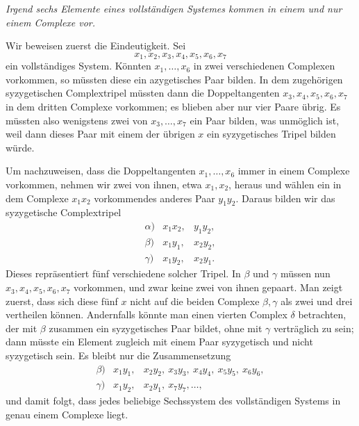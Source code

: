 \documentclass[11pt]{article}
\begin{document}
\emph{Irgend sechs Elemente eines vollständigen Systemes kommen in einem und nur einem Complexe vor.}

Wir beweisen zuerst die Eindeutigkeit. Sei
\begin{equation}
 x_1,x_2,x_3,x_4,x_5,x_6,x_7
 \tag{1}
\end{equation}
ein vollständiges System. Könnten \(x_1,\ldots,x_6\) in zwei verschiedenen Complexen vorkommen, so müssten diese ein azygetisches Paar bilden. In dem zugehörigen syzygetischen Complextripel müssten dann die Doppeltangenten \(x_3,x_4,x_5,x_6,x_7\) in dem dritten Complexe vorkommen; es blieben aber nur vier Paare übrig. Es müssten also wenigstens zwei von \(x_3,\ldots,x_7\) ein Paar bilden, was unmöglich ist, weil dann dieses Paar mit einem der übrigen \(x\) ein syzygetisches Tripel bilden würde.

Um nachzuweisen, dass die Doppeltangenten \(x_1,\ldots,x_6\) immer in einem Complexe vorkommen, nehmen wir zwei von ihnen, etwa \(x_1,x_2\), heraus und wählen ein in dem Complexe \(x_1x_2\) vorkommendes anderes Paar \(y_1y_2\). Daraus bilden wir das syzygetische Complextripel
\begin{equation}
\begin{array}{lll}
\alpha)&x_1x_2,&y_1y_2,\\
\beta)&x_1y_1,&x_2y_2,\\
\gamma)&x_1y_2,&x_2y_1.
\end{array}
\tag{2}
\end{equation}
Dieses repräsentiert fünf verschiedene solcher Tripel. In \(\beta\) und \(\gamma\) müssen nun \(x_3,x_4,x_5,x_6,x_7\) vorkommen, und zwar keine zwei von ihnen gepaart. Man zeigt zuerst, dass sich diese fünf \(x\) nicht auf die beiden Complexe \(\beta,\gamma\) als zwei und drei vertheilen können. Andernfalls könnte man einen vierten Complex \(\delta\) betrachten, der mit \(\beta\) zusammen ein syzygetisches Paar bildet, ohne mit \(\gamma\) verträglich zu sein; dann müsste ein Element zugleich mit einem Paar syzygetisch und nicht syzygetisch sein. Es bleibt nur die Zusammensetzung
\begin{equation}
\begin{array}{lll}
\beta)&x_1y_1,&x_2y_2,\ x_3y_3,\ x_4y_4,\ x_5y_5,\ x_6y_6,\\
\gamma)&x_1y_2,&x_2y_1,\ x_7y_7,\ldots,
\end{array}
\tag{3}
\end{equation}
und damit folgt, dass jedes beliebige Sechssystem des vollständigen Systems in genau einem Complexe liegt.
\end{document}
